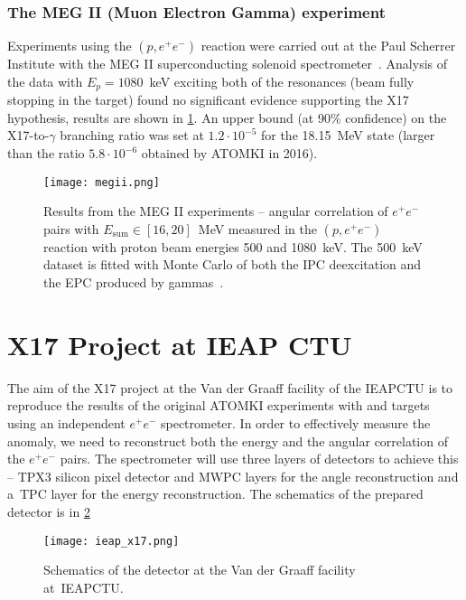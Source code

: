 			\subsubsection{The MEG II (Muon Electron Gamma) experiment}
				Experiments using the $(p,e^+e^-)$ reaction were carried out at the Paul Scherrer Institute with the MEG II superconducting solenoid spectrometer~\cite{megii}. Analysis of the data with $E_p = 1080$~keV exciting both of the resonances (beam fully stopping in the target) found no significant evidence supporting the X17 hypothesis, results are shown in \cref{fig:megii}. An upper bound (at 90\% confidence) on the X17\nobreakdash-to\nobreakdash-$\gamma$ branching ratio was set at $1.2\cdot10^{-5}$ for the 18.15~MeV state (larger than the ratio $5.8\cdot10^{-6}$ obtained by ATOMKI in 2016).
				
				\begin{figure}
					\centering
					\texttt{[image: megii.png]}
					\caption{Results from the MEG II experiments -- angular correlation of $e^+e^-$ pairs with $E_\text{sum} \in [16,20]$~MeV measured in the $(p,e^+e^-)$ reaction with proton beam energies 500 and 1080~keV. The 500~keV dataset is fitted with Monte Carlo of both the \ac{IPC} deexcitation and the \ac{EPC} produced by gammas~\cite{megii}.}
					\label{fig:megii}
				\end{figure}
			
	
	\section{X17 Project at IEAP CTU}
	\label{sec:IEAP}
		The aim of the X17 project at the Van der Graaff facility of the \acl{IEAPCTU} is to reproduce the results of the original ATOMKI experiments with  and  targets using an independent $e^+e^-$ spectrometer. In order to effectively measure the anomaly, we need to reconstruct both the energy and the angular correlation of the $e^+e^-$ pairs. The spectrometer will use three layers of detectors to achieve this -- \acf{TPX3} silicon pixel detector and \acf{MWPC} layers for the angle reconstruction and a~\acf{TPC} layer for the energy reconstruction. The schematics of the prepared detector is in \cref{fig:ieap}
			
			\begin{figure}
				\centering
				\texttt{[image: ieap\_x17.png]}
				\caption{Schematics of the detector at the Van der Graaff facility at~\ac{IEAPCTU}.}
				\label{fig:ieap}
			\end{figure}
		
